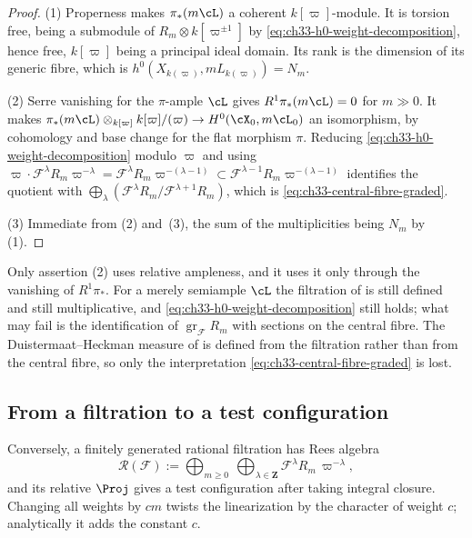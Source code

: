 \begin{proof}
(1)  Properness makes $\pi_\ast(m\cL)$ a coherent
$k[\varpi]$-module.  It is torsion free, being a submodule of
$R_m\otimes k[\varpi^{\pm1}]$ by
\eqref{eq:ch33-h0-weight-decomposition}, hence free, $k[\varpi]$ being a
principal ideal domain.  Its rank is the dimension of its generic fibre,
which is $h^0(X_{k(\varpi)},mL_{k(\varpi)})=N_m$.

(2)  Serre vanishing for the $\pi$-ample $\cL$ gives
$R^1\pi_\ast(m\cL)=0$ for $m\gg0$.  It makes
$\pi_\ast(m\cL)\otimes_{k[\varpi]}k[\varpi]/(\varpi)
\to H^0(\cX_0,m\cL_0)$ an isomorphism, by cohomology and base change for
the flat morphism $\pi$.  Reducing
\eqref{eq:ch33-h0-weight-decomposition} modulo $\varpi$ and using
$\varpi\cdot\mathcal F^\lambda R_m\varpi^{-\lambda}
=\mathcal F^\lambda R_m\varpi^{-(\lambda-1)}\subset
\mathcal F^{\lambda-1}R_m\varpi^{-(\lambda-1)}$ identifies the quotient
with $\bigoplus_\lambda(\mathcal F^\lambda R_m/\mathcal F^{\lambda+1}R_m)$,
which is \eqref{eq:ch33-central-fibre-graded}.

(3)  Immediate from (2) and
\,(3), the sum of the
multiplicities being $N_m$ by (1).
\end{proof}

\begin{remark}
\label{rem:ch33-ampleness-needed}
Only assertion (2) uses relative ampleness, and it uses it only through the
vanishing of $R^1\pi_\ast$.  For a merely semiample $\cL$ the
filtration of  is still defined and still
multiplicative, and \eqref{eq:ch33-h0-weight-decomposition} still holds; what
may fail is the identification of $\operatorname{gr}_{\mathcal F}R_m$ with sections on
the central fibre.  The Duistermaat--Heckman measure of
 is defined from the filtration rather than from the
central fibre, so only the interpretation
\eqref{eq:ch33-central-fibre-graded} is lost.
\end{remark}

\subsection{From a filtration to a test configuration}
\label{sec:ch33-filtration-to-tc}

Conversely, a finitely generated rational filtration has Rees algebra
\begin{equation}
\label{eq:filtration-rees}
 \mathcal R(\mathcal F)
   :=\bigoplus_{m\geq0}\ \bigoplus_{\lambda\in\mathbf Z}
       \mathcal F^\lambda R_m\,\varpi^{-\lambda},
\end{equation}
and its relative $\Proj$ gives a test configuration after taking integral
closure.  Changing all weights by $cm$ twists the linearization by the
character of weight $c$; analytically it adds the constant $c$.

